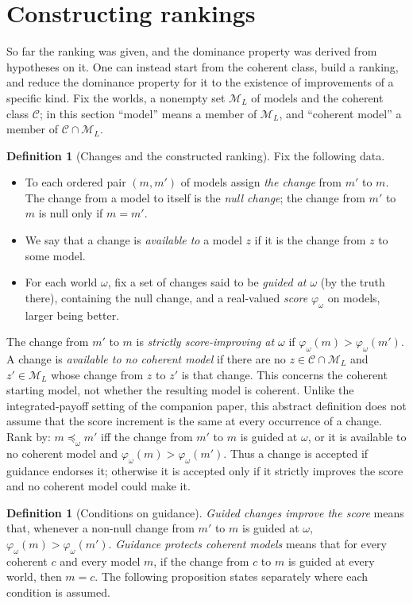 \documentclass[11pt]{article}
\theoremstyle{definition}
\newtheorem{definition}[theorem]{Definition}
\theoremstyle{remark}
\newcommand{\M}{\mathcal M}
\newcommand{\C}{\mathcal C}
\begin{document}
\section{Constructing rankings}\label{sec:construct}
So far the ranking was given, and the dominance property was derived from hypotheses on it. One can instead start from the coherent class, build a ranking, and reduce the dominance property for it to the existence of improvements of a specific kind. Fix the worlds, a nonempty set $\M_L$ of models and the coherent class $\C$; in this section ``model'' means a member of $\M_L$, and ``coherent model'' a member of $\C\cap\M_L$.
\begin{definition}[Changes and the constructed ranking]\label{def:construction}
Fix the following data.
\begin{itemize}[leftmargin=*]
\item To each ordered pair $(m,m')$ of models assign \emph{the change} from $m'$ to $m$. The change from a model to itself is the \emph{null change}; the change from $m'$ to $m$ is null only if $m=m'$.
\item We say that a change is \emph{available to} a model $z$ if it is the change from $z$ to some model.
\item For each world $\omega$, fix a set of changes said to be \emph{guided at $\omega$} (by the truth there), containing the null change, and a real-valued \emph{score} $\varphi_\omega$ on models, larger being better.
\end{itemize}
The change from $m'$ to $m$ is \emph{strictly score-improving at $\omega$} if
$\varphi_\omega(m)>\varphi_\omega(m')$.
A change is \emph{available to no coherent model} if there are no
$z\in\C\cap\M_L$ and $z'\in\M_L$ whose change from $z$ to $z'$ is that change.
This concerns the coherent starting model, not whether the resulting model is coherent.
Unlike the integrated-payoff setting of the companion paper, this abstract definition does
not assume that the score increment is the same at every occurrence of a change.
Rank by: $m\preceq_\omega m'$ iff the change from $m'$ to $m$ is guided at $\omega$, or it is available to no coherent model and $\varphi_\omega(m)>\varphi_\omega(m')$. Thus a change is accepted if guidance endorses it; otherwise it is accepted only if it strictly improves the score and no coherent model could make it.
\end{definition}

\begin{definition}[Conditions on guidance]\label{def:guidance-conditions}
\emph{Guided changes improve the score} means that, whenever a non-null change from
$m'$ to $m$ is guided at $\omega$, $\varphi_\omega(m)>\varphi_\omega(m')$.
\emph{Guidance protects coherent models} means that for every coherent $c$ and every
model $m$, if the change from $c$ to $m$ is guided at every world, then $m=c$.
The following proposition states separately where each condition is assumed.
\end{definition}
\end{document}
